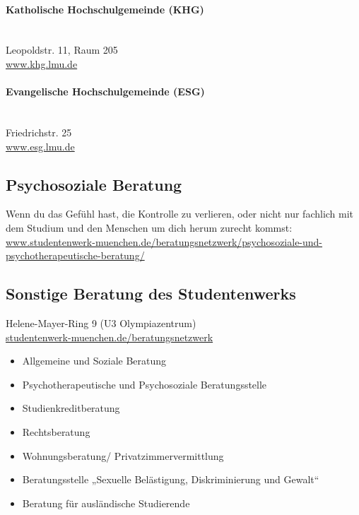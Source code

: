 \paragraph{Katholische Hochschulgemeinde (KHG)}\hfill\\
Leopoldstr. 11, Raum 205\\
\url{www.khg.lmu.de}

\paragraph{Evangelische Hochschulgemeinde (ESG)}\hfill\\
Friedrichstr. 25\\
\url{www.esg.lmu.de}



\subsection{Psychosoziale Beratung}

Wenn du das Gefühl hast, die Kontrolle zu verlieren, oder nicht nur fachlich mit
dem Studium und den Menschen um dich herum zurecht kommst:\\
\url{www.studentenwerk-muenchen.de/beratungsnetzwerk/psychosoziale-und-psychotherapeutische-beratung/}


\subsection{Sonstige Beratung des Studentenwerks}
Helene-Mayer-Ring 9 (U3 Olympiazentrum)\\
\url{studentenwerk-muenchen.de/beratungsnetzwerk}

\begin{itemize}
	\item Allgemeine und Soziale Beratung
	\item Psychotherapeutische und Psychosoziale Beratungsstelle
	\item Studienkreditberatung
	\item Rechtsberatung
	\item Wohnungsberatung/ Privatzimmervermittlung
	\item Beratungsstelle „Sexuelle Belästigung, Diskriminierung und Gewalt“
	\item Beratung für ausländische Studierende
\end{itemize}

